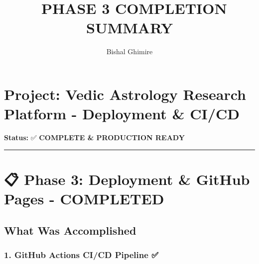 \documentclass[
  11pt,
  oneside,
  openany]{scrbook}
\title{🎯 PHASE 3 COMPLETION SUMMARY}
\author{Bishal Ghimire}
\date{}
\begin{document}
\frontmatter
\maketitle



\mainmatter
\chapter{Project: Vedic Astrology Research Platform - Deployment \&
CI/CD}\label{project-vedic-astrology-research-platform---deployment-cicd}

\textbf{Status:} ✅ \textbf{COMPLETE \& PRODUCTION READY}

\begin{center}\rule{0.5\linewidth}{0.5pt}\end{center}

\chapter{📋 Phase 3: Deployment \& GitHub Pages -
COMPLETED}\label{phase-3-deployment-github-pages---completed}

\section{\texorpdfstring{\textbf{What Was
Accomplished}}{What Was Accomplished}}\label{what-was-accomplished}

\subsection{\texorpdfstring{1. \textbf{GitHub Actions CI/CD Pipeline}
✅}{1. GitHub Actions CI/CD Pipeline ✅}}\label{github-actions-cicd-pipeline}
\end{document}
